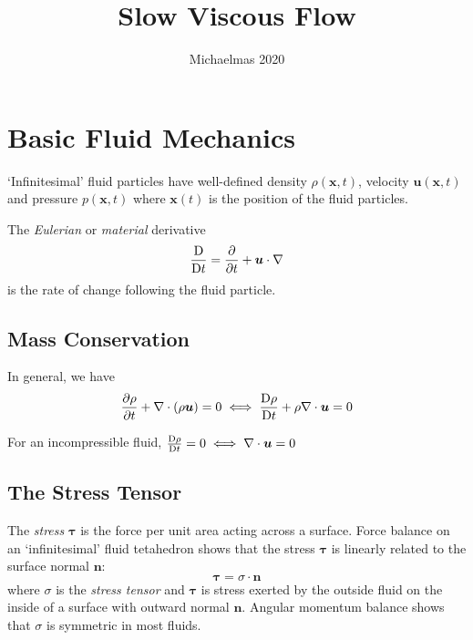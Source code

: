 \documentclass{jknotes}
\begin{document}
\title{Slow Viscous Flow}
\date{Michaelmas 2020}

\maketitle
\suggestionsspiel
\tableofcontents

\section{Basic Fluid Mechanics}
`Infinitesimal' fluid particles have well-defined density $\rho(\bm{x},t)$,
velocity $\bm{u}(\bm{x},t)$ and pressure $p(\bm{x},t)$ where $\bm{x}(t)$ is
the position of the fluid particles.

\begin{defn}
	The \emph{Eulerian} or \emph{material} derivative
	\begin{equation}
		\frac{\mathrm{D}}{\mathrm{D}{t}} = \frac{\partial}{\partial t} + \bm{u}\cdot
		\nabla
	\end{equation}
	is the rate of change following the fluid particle.
\end{defn}

\subsection{Mass Conservation}
In general, we have
\begin{equation}
\frac{\partial \rho}{\partial t} + \nabla \cdot \left(\rho \bm{u}\right) = 0
\iff \frac{\mathrm{D}{\rho}}{\mathrm{D}{t}} + \rho \nabla \cdot \bm{u} = 0
\end{equation}

For an incompressible fluid, $\frac{\mathrm{D}{\rho}}{\mathrm{D}{t}} = 0 \iff \nabla
\cdot \bm{u} = 0$

\subsection{The Stress Tensor}
The \emph{stress} $\bm{\tau}$ is the force per unit area acting across a
surface. Force balance on an `infinitesimal' fluid tetahedron shows that the
stress $\bm{\tau}$ is linearly related to the surface normal $\bm{n}$:
\begin{equation}
	\bm{\tau} = \sigma \cdot \bm{n}
\end{equation}
where $\sigma$ is the \emph{stress tensor} and $\bm{\tau}$ is stress exerted
by the outside fluid on the inside of a surface with outward normal $\bm{n}$.
Angular momentum balance shows that $\sigma$ is symmetric in most fluids.
\end{document}
